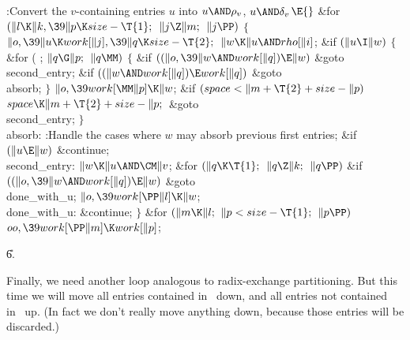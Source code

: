 \Y\B\4:Convert the $v$-containing entries $u$ into $u\AND\rho_v$, $u\AND%
\delta_v$\X${}\E{}$\6
\&{for} ${}(\|l\K\|k,\39\|p\K\\{size}-\T{1};{}$ ${}\|j\Z\|m;{}$ ${}\|j\PP){}$\5
${}\{{}$\1\6
${}\|o,\39\|u\K\\{work}[\|j],\39\|q\K\\{size}-\T{2};{}$\6
${}\|w\K\|u\AND\\{rho}[\|i]{}$;\6
\&{if} ${}(\|u\I\|w){}$\5
${}\{{}$\1\6
\&{for} ( ; ${}\|q\G\|p;{}$ ${}\|q\MM){}$\5
${}\{{}$\1\6
\&{if} ${}((\|o,\39\|w\AND\\{work}[\|q])\E\|w){}$\1\5
\&{goto} \\{second\_entry};\2\6
\&{if} ${}((\|w\AND\\{work}[\|q])\E\\{work}[\|q]){}$\1\5
\&{goto} \\{absorb};\2\6
\4${}\}{}$\2\6
${}\|o,\39\\{work}[\MM\|p]\K\|w{}$;\6
\&{if} ${}(\\{space}<\|m+\T{2}+\\{size}-\|p){}$\1\5
${}\\{space}\K\|m+\T{2}+\\{size}-\|p;{}$\2\6
\&{goto} \\{second\_entry};\6
\4${}\}{}$\2\6
\4\\{absorb}:\5
:Handle the cases where $w$ may absorb previous first entries\X;\6
\&{if} ${}(\|u\E\|w){}$\1\5
\&{continue};\2\6
\4\\{second\_entry}:\5
${}\|w\K\|u\AND\CM\|v{}$;\6
\&{for} ${}(\|q\K\T{1};{}$ ${}\|q\Z\|k;{}$ ${}\|q\PP){}$\1\6
\&{if} ${}((\|o,\39\|w\AND\\{work}[\|q])\E\|w){}$\1\5
\&{goto} \\{done\_with\_u};\2\2\6
${}\|o,\39\\{work}[\PP\|l]\K\|w{}$;\6
\4\\{done\_with\_u}:\5
\&{continue};\6
\4${}\}{}$\2\6
\&{for} ${}(\|m\K\|l;{}$ ${}\|p<\\{size}-\T{1};{}$ ${}\|p\PP){}$\1\5
${}\\{oo},\39\\{work}[\PP\|m]\K\\{work}[\|p]{}$;\2\par
\U6.\fi

Finally, we need another loop analogous to
radix-exchange partitioning.
But this time we will move all entries contained in~ down, and
all entries not contained in~ up. (In fact we don't really
move anything down, because those entries will be discarded.)

